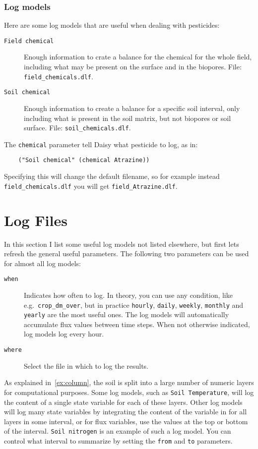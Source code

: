 \documentclass[a4paper]{article}
\begin{document}

\subsubsection{Log models}

Here are some log models that are useful when dealing with pesticides:
\begin{description}
\item[\texttt{Field chemical}] Enough information to crate a balance
  for the chemical for the whole field, including what may be present
  on the surface and in the biopores. File:
  \texttt{field\_chemicals.dlf}.
\item[\texttt{Soil chemical}] Enough information to create a balance
  for a specific soil interval, only including what is present in the
  soil matrix, but not biopores or soil surface. File:
  \texttt{soil\_chemicals.dlf}.
\end{description}

The \texttt{chemical} parameter tell Daisy what pesticide to log, as
in:
\begin{verbatim}
    ("Soil chemical" (chemical Atrazine))
\end{verbatim}
Specifying this will change the default filename, so for example
instead \texttt{field\_chemicals.dlf} you will get
\texttt{field\_Atrazine.dlf}.

\section{Log Files}
\label{sec:output}

In this section I list some useful log models not listed elsewhere,
but first lets refresh the general useful parameters.  The following
two parameters can be used for almost all log models:
\begin{description}
\item[\texttt{when}] Indicates how often to log.  In theory, you can
  use any condition, like e.g.\ \texttt{crop\_dm\_over}, but in
  practice \texttt{hourly}, \texttt{daily}, \texttt{weekly},
  \texttt{monthly} and \texttt{yearly} are the most useful ones.  The
  log models will automatically accumulate flux values between time
  steps.  When not otherwise indicated, log models log every hour.
\item[\texttt{where}] Select the file in which to log the results.
\end{description}

As explained in~\ref{ex:column}, the soil is split into a large number
of numeric layers for computational purposes.  Some log models, such
as \texttt{Soil Temperature}, will log the content of a single state
variable for each of these layers.  Other log models will log many
state variables by integrating the content of the variable in for all
layers in some interval, or for flux variables, use the values at the
top or bottom of the interval.  \texttt{Soil nitrogen} is an example
of such a log model.  You can control what interval to summarize by
setting the \texttt{from} and \texttt{to} parameters.
\end{document}
